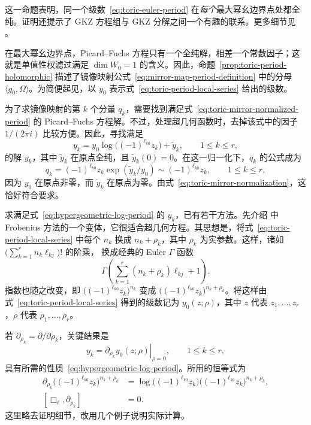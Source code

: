 这一命题表明，同一个级数~\eqref{eq:toric-euler-period} 在\emph{每个}最大幂幺边界点处都全纯。证明还提示了 GKZ 方程组与 GKZ 分解之间一个有趣的联系。更多细节见 。

在最大幂幺边界点，Picard--Fuchs 方程只有一个全纯解，相差一个常数因子；这就是单值性权滤过满足 $\dim W_0=1$ 的含义。因此，命题~\ref{prop:toric-period-holomorphic} 描述了镜像映射公式~\eqref{eq:mirror-map-period-definition} 中的分母 $\langle g_0,\Omega\rangle$。为简便起见，以 $y_0$ 表示式~\eqref{eq:toric-period-local-series} 给出的级数。

为了求镜像映射的第 $k$ 个分量 $q_k$，需要找到满足式~\eqref{eq:toric-mirror-normalized-period} 的 Picard--Fuchs 方程解。不过，处理超几何函数时，去掉该式中的因子 $1/(2\pi i)$ 比较方便。因此，寻找满足
\begin{equation}\label{eq:hypergeometric-log-period}
y_k=y_0\log\bigl((-1)^{\ell_{k0}}z_k\bigr)+\widetilde y_k,
\qquad1\leq k\leq r,
\end{equation}
的解 $y_k$，其中 $\widetilde y_k$ 在原点全纯，且 $\widetilde y_k(0)=0$。在这一归一化下，$q_k$ 的公式成为
\begin{equation}\label{eq:hypergeometric-mirror-coordinate}
q_k=(-1)^{\ell_{k0}}z_k\exp(\widetilde y_k/y_0)
\sim(-1)^{\ell_{k0}}z_k,\qquad1\leq k\leq r,
\end{equation}
因为 $y_0$ 在原点非零，而 $\widetilde y_k$ 在原点为零。由式~\eqref{eq:toric-mirror-normalization}，这恰好符合要求。

求满足式~\eqref{eq:hypergeometric-log-period} 的 $y_k$，已有若干方法。先介绍  中 Frobenius 方法的一个变体，它很适合超几何方程。其思想是，将式~\eqref{eq:toric-period-local-series} 中每个 $n_k$ 换成 $n_k+\rho_k$，其中 $\rho_k$ 为实参数。这样，诸如 $\bigl(\sum_{k=1}^rn_k\ell_{kj}\bigr)!$ 的阶乘，
换成经典的 Euler $\Gamma$ 函数
\[
\Gamma\left(\sum_{k=1}^r(n_k+\rho_k)\ell_{kj}+1\right).
\]
指数也随之改变，即 $\bigl((-1)^{\ell_{k0}}z_k\bigr)^{n_k}$ 变成
$\bigl((-1)^{\ell_{k0}}z_k\bigr)^{n_k+\rho_k}$。将这样由式~\eqref{eq:toric-period-local-series} 得到的级数记为 $y_0(z;\rho)$，其中 $z$ 代表 $z_1,\ldots,z_r$，$\rho$ 代表 $\rho_1,\ldots,\rho_r$。

若 $\partial_{\rho_k}=\partial/\partial\rho_k$，关键结果是
\[
y_k=\left.\partial_{\rho_k}y_0(z;\rho)\right|_{\rho=0},
\qquad1\leq k\leq r,
\]
具有所需的性质~\eqref{eq:hypergeometric-log-period}。所用的恒等式为
\[
\begin{aligned}
\partial_{\rho_k}\bigl((-1)^{\ell_{k0}}z_k\bigr)^{n_k+\rho_k}
&=\log\bigl((-1)^{\ell_{k0}}z_k\bigr)
\bigl((-1)^{\ell_{k0}}z_k\bigr)^{n_k+\rho_k},\\
[\Box_\ell,\partial_{\rho_k}]&=0.
\end{aligned}
\]
这里略去证明细节，改用几个例子说明实际计算。

